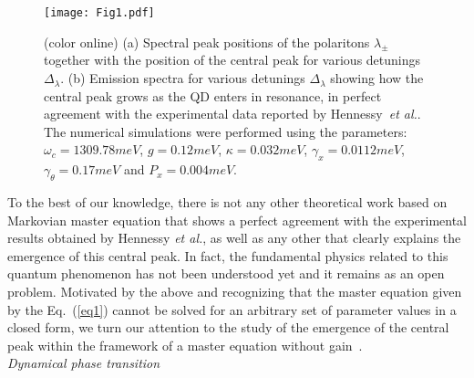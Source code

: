\documentclass[aps,prl,showpacs,twocolumn]{revtex4}
\begin{document}
%
\begin{figure}[h!]
\texttt{[image: Fig1.pdf]}
\caption{(color online) (a) Spectral peak positions of the polaritons $\lambda_\pm$ together with the position of the central peak for various detunings $\Delta_\lambda$. (b) Emission spectra for various detunings $\Delta_\lambda$ showing how the central peak grows as the QD enters in resonance, in perfect agreement with the experimental data reported by Hennessy~{\it et al.}. The numerical simulations were performed using the parameters: $\omega_c=1309.78 meV$, $g=0.12 meV$, $\kappa=0.032 meV$, $\gamma_x=0.0112 meV$, $\gamma_{\theta}=0.17 meV$ and $P_x=0.004 meV$.}\label{fig-henessy}
\end{figure}
%
To the best of our knowledge, there is not any other theoretical work based on Markovian master equation that shows a perfect agreement with the experimental results obtained by Hennessy {\it et al.}, as well as any other that clearly explains the emergence of this central peak. In fact, the fundamental physics related to this quantum phenomenon has not  been understood yet and it remains as an open problem. Motivated by the above and recognizing that the master equation given by the Eq.~(\ref{eq1}) cannot be solved for an arbitrary set of parameter values in a closed form, we turn our attention to the study of the emergence of the central peak within the framework of a master equation without gain~\cite{Torres:2014}.
\\
\textit{Dynamical phase transition}\textendash 
\end{document}
